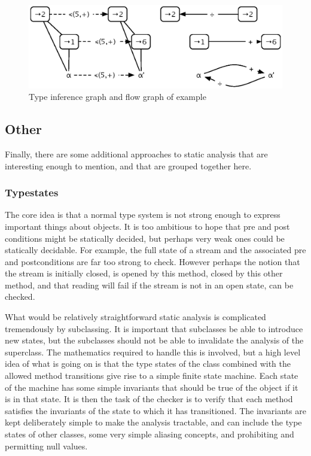 \documentclass{article}
\begin{document}
\begin{multicols}{2}
\begin{figure}
  \begin{center}
    \leavevmode
    \includegraphics{flow}
  \end{center}
  \caption{Type inference graph and flow graph of example}
  \label{fig:tig}
\end{figure}

\subsection{Other}

Finally, there are some additional approaches to static analysis that
are interesting enough to mention, and that are grouped together here.

\subsubsection{Typestates~\cite{DBLP:conf/ecoop/2004}}

The core idea is that a normal type system is not strong enough to
express important things about objects.  It is too ambitious to hope
that pre and post conditions might be statically decided, but perhaps
very weak ones could be statically decidable.  For example, the full
state of a stream and the associated pre and postconditions are far
too strong to check.  However perhaps the notion that the stream is
initially closed, is opened by this method, closed by this other
method, and that reading will fail if the stream is not in an open
state, can be checked.

What would be relatively straightforward static analysis is
complicated tremendously by subclassing.  It is important that
subclasses be able to introduce new states, but the subclasses should
not be able to invalidate the analysis of the superclass.  The
mathematics required to handle this is involved, but a high level idea
of what is going on is that the type states of the class combined with
the allowed method transitions give rise to a simple finite state
machine.  Each state of the machine has some simple invariants that
should be true of the object if it is in that state.  It is then the
task of the checker is to verify that each method satisfies the
invariants of the state to which it has transitioned.  The invariants
are kept deliberately simple to make the analysis tractable, and can
include the type states of other classes, some very simple aliasing
concepts, and prohibiting and permitting null values.


\end{multicols}
\end{document}
